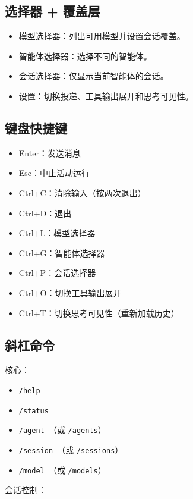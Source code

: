 \subsection{选择器 + 覆盖层}


\begin{itemize}
  \item 模型选择器：列出可用模型并设置会话覆盖。
  \item 智能体选择器：选择不同的智能体。
  \item 会话选择器：仅显示当前智能体的会话。
  \item 设置：切换投递、工具输出展开和思考可见性。
\end{itemize}


\subsection{键盘快捷键}


\begin{itemize}
  \item Enter：发送消息
  \item Esc：中止活动运行
  \item Ctrl+C：清除输入（按两次退出）
  \item Ctrl+D：退出
  \item Ctrl+L：模型选择器
  \item Ctrl+G：智能体选择器
  \item Ctrl+P：会话选择器
  \item Ctrl+O：切换工具输出展开
  \item Ctrl+T：切换思考可见性（重新加载历史）
\end{itemize}


\subsection{斜杠命令}


核心：

\begin{itemize}
  \item \texttt{/help}
  \item \texttt{/status}
  \item \texttt{/agent }（或 \texttt{/agents}）
  \item \texttt{/session }（或 \texttt{/sessions}）
  \item \texttt{/model }（或 \texttt{/models}）
\end{itemize}


会话控制：

